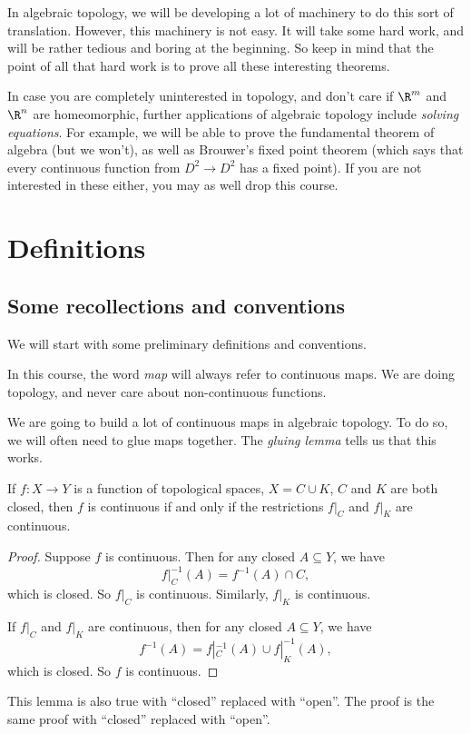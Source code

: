 \documentclass[a4paper]{article}
\begin{document}
In algebraic topology, we will be developing a lot of machinery to do this sort of translation. However, this machinery is not easy. It will take some hard work, and will be rather tedious and boring at the beginning. So keep in mind that the point of all that hard work is to prove all these interesting theorems.

In case you are completely uninterested in topology, and don't care if $\R^m$ and $\R^n$ are homeomorphic, further applications of algebraic topology include \emph{solving equations}. For example, we will be able to prove the fundamental theorem of algebra (but we won't), as well as Brouwer's fixed point theorem (which says that every continuous function from $D^2 \to D^2$ has a fixed point). If you are not interested in these either, you may as well drop this course.

\section{Definitions}
\subsection{Some recollections and conventions}
We will start with some preliminary definitions and conventions.

\begin{defi}[Map]
  In this course, the word \emph{map} will always refer to continuous maps. We are doing topology, and never care about non-continuous functions.
\end{defi}

We are going to build a lot of continuous maps in algebraic topology. To do so, we will often need to glue maps together. The \emph{gluing lemma} tells us that this works.
\begin{lemma}
  If $f: X\to Y$ is a function of topological spaces, $X = C\cup K$, $C$ and $K$ are both closed, then $f$ is continuous if and only if the restrictions $f|_C$ and $f|_K$ are continuous.
\end{lemma}

\begin{proof}
  Suppose $f$ is continuous. Then for any closed $A \subseteq Y$, we have
  \[
    f|_C^{-1}(A) = f^{-1}(A) \cap C,
  \]
  which is closed. So $f|_C$ is continuous. Similarly, $f|_K$ is continuous.

  If $f|_C$ and $f|_K$ are continuous, then for any closed $A \subseteq Y$, we have
  \[
    f^{-1}(A) = f|_C^{-1}(A) \cup f|_K^{-1}(A),
  \]
  which is closed. So $f$ is continuous.
\end{proof}
This lemma is also true with ``closed'' replaced with ``open''. The proof is the same proof with ``closed'' replaced with ``open''.
\end{document}
